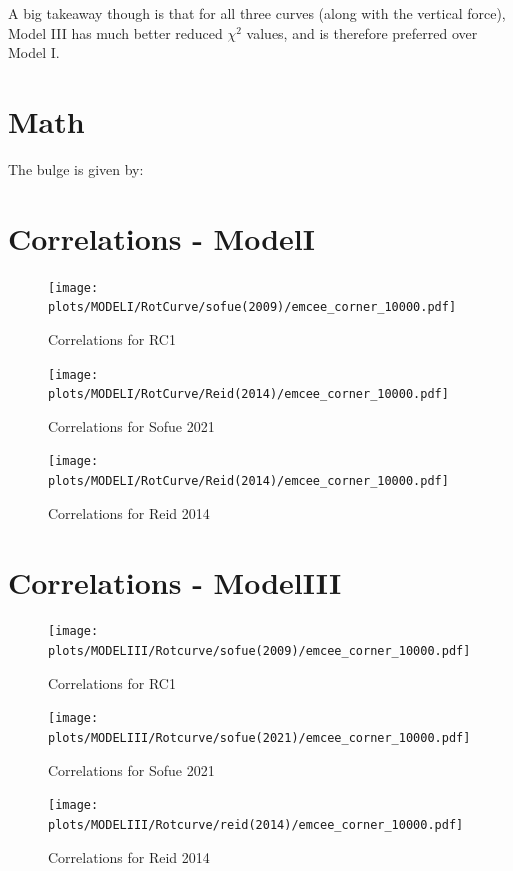\documentclass[fleqn,usenatbib]{mnras}
\begin{document}
A big takeaway though is that for all three curves (along with the vertical force), Model III has much better reduced $\chi^2$ values, and is therefore preferred over Model I.







\appendix
\section{Math}

The bulge is given by:

\section{Correlations - ModelI}

\begin{figure}
\texttt{[image: plots/MODELI/RotCurve/sofue(2009)/emcee\_corner\_10000.pdf]}
\caption{Correlations for RC1
}
\label{fig:Model1_Sofue2009}
\end{figure}

\begin{figure}
\texttt{[image: plots/MODELI/RotCurve/Reid(2014)/emcee\_corner\_10000.pdf]}
\caption{Correlations for Sofue 2021
}
\label{fig:Model1_Sofue2021}
\end{figure}

\begin{figure}
\texttt{[image: plots/MODELI/RotCurve/Reid(2014)/emcee\_corner\_10000.pdf]}
\caption{Correlations for Reid 2014
}
\label{fig:Model1_Reid2014}
\end{figure}
\section{Correlations - ModelIII}

\begin{figure}
\texttt{[image: plots/MODELIII/Rotcurve/sofue(2009)/emcee\_corner\_10000.pdf]}
\caption{Correlations for RC1
}
\label{fig:Model3_Sofue2009}
\end{figure}

\begin{figure}
\texttt{[image: plots/MODELIII/Rotcurve/sofue(2021)/emcee\_corner\_10000.pdf]}
\caption{Correlations for Sofue 2021
}
\label{fig:Model3_Sofue2021}
\end{figure}

\begin{figure}
\texttt{[image: plots/MODELIII/Rotcurve/reid(2014)/emcee\_corner\_10000.pdf]}
\caption{Correlations for Reid 2014
}
\label{fig:Model3_Reid2014}
\end{figure}
\bsp	%
\label{lastpage}
\end{document}
